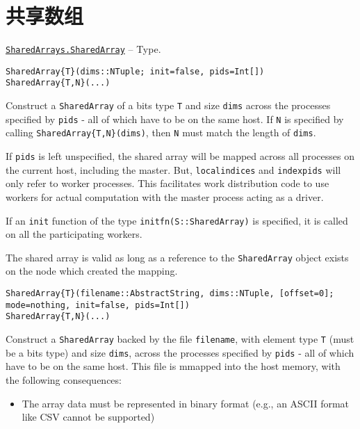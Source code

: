 \hypertarget{3058127117657456394}{}


\chapter{共享数组}


\hypertarget{15069300442338861576}{} 
\hyperlink{15069300442338861576}{\texttt{SharedArrays.SharedArray}}  -- {Type.}

\begin{adjustwidth}{2em}{0pt}


\begin{verbatim}
SharedArray{T}(dims::NTuple; init=false, pids=Int[])
SharedArray{T,N}(...)
\end{verbatim}

Construct a \texttt{SharedArray} of a bits type \texttt{T} and size \texttt{dims} across the processes specified by \texttt{pids} - all of which have to be on the same host.  If \texttt{N} is specified by calling \texttt{SharedArray\{T,N\}(dims)}, then \texttt{N} must match the length of \texttt{dims}.

If \texttt{pids} is left unspecified, the shared array will be mapped across all processes on the current host, including the master. But, \texttt{localindices} and \texttt{indexpids} will only refer to worker processes. This facilitates work distribution code to use workers for actual computation with the master process acting as a driver.

If an \texttt{init} function of the type \texttt{initfn(S::SharedArray)} is specified, it is called on all the participating workers.

The shared array is valid as long as a reference to the \texttt{SharedArray} object exists on the node which created the mapping.


\begin{lstlisting}
SharedArray{T}(filename::AbstractString, dims::NTuple, [offset=0]; mode=nothing, init=false, pids=Int[])
SharedArray{T,N}(...)
\end{lstlisting}

Construct a \texttt{SharedArray} backed by the file \texttt{filename}, with element type \texttt{T} (must be a bits type) and size \texttt{dims}, across the processes specified by \texttt{pids} - all of which have to be on the same host. This file is mmapped into the host memory, with the following consequences:

\begin{itemize}
\item The array data must be represented in binary format (e.g., an ASCII format like CSV cannot be supported)



\end{itemize}
\end{adjustwidth}
